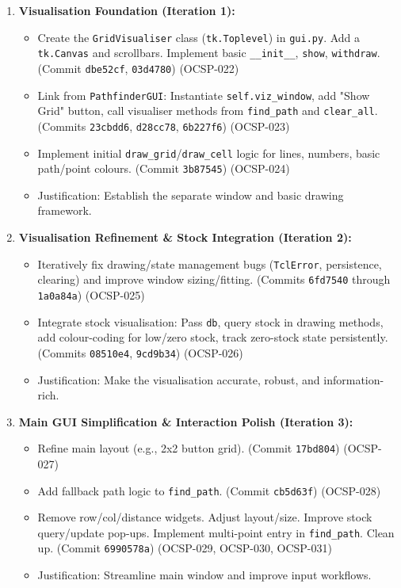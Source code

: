 \begin{enumerate}
	\item \textbf{Visualisation Foundation (Iteration 1):}
	\begin{itemize}
		\item Create the \verb|GridVisualiser| class (\verb|tk.Toplevel|) in \verb|gui.py|. Add a \verb|tk.Canvas| and scrollbars. Implement basic \verb|__init__|, \verb|show|, \verb|withdraw|. (Commit \verb|dbe52cf|, \verb|03d4780|) (OCSP-022)
		\item Link from \verb|PathfinderGUI|: Instantiate \verb|self.viz_window|, add "Show Grid" button, call visualiser methods from \verb|find_path| and \verb|clear_all|. (Commits \verb|23cbdd6|, \verb|d28cc78|, \verb|6b227f6|) (OCSP-023)
		\item Implement initial \verb|draw_grid|/\verb|draw_cell| logic for lines, numbers, basic path/point colours. (Commit \verb|3b87545|) (OCSP-024)
		\item Justification: Establish the separate window and basic drawing framework.
	\end{itemize}
	\item \textbf{Visualisation Refinement \& Stock Integration (Iteration 2):}
	\begin{itemize}
		\item Iteratively fix drawing/state management bugs (\verb|TclError|, persistence, clearing) and improve window sizing/fitting. (Commits \verb|6fd7540| through \verb|1a0a84a|) (OCSP-025)
		\item Integrate stock visualisation: Pass \verb|db|, query stock in drawing methods, add colour-coding for low/zero stock, track zero-stock state persistently. (Commits \verb|08510e4|, \verb|9cd9b34|) (OCSP-026)
		\item Justification: Make the visualisation accurate, robust, and information-rich.
	\end{itemize}
	\item \textbf{Main GUI Simplification \& Interaction Polish (Iteration 3):}
	\begin{itemize}
		\item Refine main layout (e.g., 2x2 button grid). (Commit \verb|17bd804|) (OCSP-027)
		\item Add fallback path logic to \verb|find_path|. (Commit \verb|cb5d63f|) (OCSP-028)
		\item Remove row/col/distance widgets. Adjust layout/size. Improve stock query/update pop-ups. Implement multi-point entry in \verb|find_path|. Clean up. (Commit \verb|6990578a|) (OCSP-029, OCSP-030, OCSP-031)
		\item Justification: Streamline main window and improve input workflows.
	\end{itemize}
\end{enumerate}

